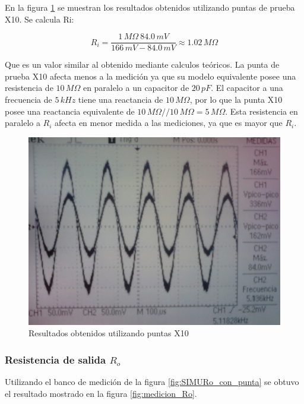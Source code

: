 \documentclass[10pt,spanish,a4paper,notitlepage]{article}
\begin{document}
En la figura \ref{fig:medicion_Ri_X10} se muestran los resultados
obtenidos utilizando puntas de prueba X10.
Se calcula Ri:

\[ \displaystyle     R_i = \frac{1\,\unit{M\Omega}\  84.0\,\unit{mV}}{166\,\unit{mV} - 84.0\,\unit{mV}} 
\approx 1.02\,\unit{M\Omega}\]

Que es un valor similar al obtenido mediante calculos teóricos.
La punta de prueba X10 afecta menos a la medición ya que su modelo equivalente posee
una resistencia de $10\,\unit{M\Omega}$ en paralelo a un capacitor
de $20\,\unit{pF}$. El capacitor a una frecuencia de $5\,\unit{kHz}$ tiene una reactancia
de $10\,\unit{M\Omega}$, por lo que la punta X10 posee una reactancia equivalente
de $10\,\unit{M\Omega} // 10\,\unit{M\Omega} = 5\,\unit{M\Omega}$.
Esta resistencia en paralelo a $R_i$ afecta en menor medida a las mediciones,
ya que es mayor que $R_i$.

\begin{figure}[H]
\centering
\includegraphics[scale=0.12]{mediciones/Ri_puntaX10.jpg}
\caption{Resultados obtenidos utilizando puntas X10}
\label{fig:medicion_Ri_X10}
\end{figure}

\subsubsection{Resistencia de salida \texorpdfstring{$R_o$}{TEXT}}

Utilizando el banco de medición de la figura \ref{fig:SIMURo_con_punta}
se obtuvo el resultado mostrado en la figura \ref{fig:medicion_Ro}.
\end{document}
